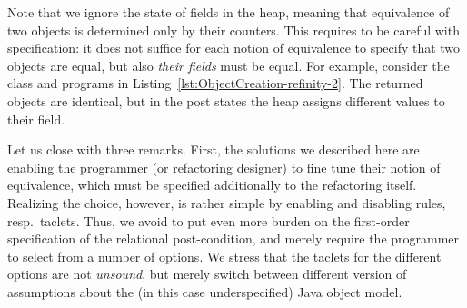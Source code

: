 Note that we ignore the state of fields in the heap, meaning that equivalence of two objects is determined only by their counters. 
This requires to be careful with specification: it does not suffice for each notion of equivalence to specify that two objects are equal, but also \emph{their fields} must be equal.
For example, consider the class and programs in Listing~\ref{lst:ObjectCreation-refinity-2}.
The returned objects are identical, but in the post states the heap assigns different values to their field.



Let us close with three remarks. First, the solutions we described here are enabling the programmer (or refactoring designer) to fine tune their notion of equivalence, which must be specified additionally to the refactoring itself.
Realizing the choice, however, is rather simple by enabling and disabling rules, resp.\ taclets. 
Thus, we avoid to put even more burden on the first-order specification of the relational post-condition, and merely require the programmer to select from a number of options.
We stress that the taclets for the different options are not \emph{unsound}, but merely switch between different version of assumptions about the (in this case underspecified) Java object model.

